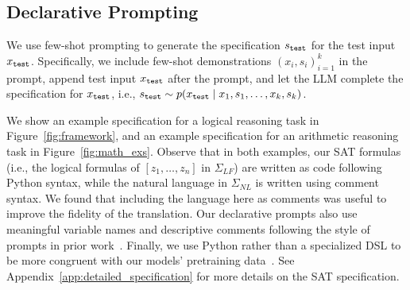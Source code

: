 \documentclass{article}
\theoremstyle{definition}
\newcommand\gd[1]{\todo[color=red!40]{{\bf Greg}: #1}}
\begin{document}


\subsection{Declarative Prompting}
\label{sec:sat_prompt}


We use few-shot prompting to generate the specification $s_{\tt test}$ for the test input $x_{\tt test}$. Specifically, we include few-shot demonstrations $(x_i,s_i)_{i=1}^k$ in the prompt, append test input $x_{\tt test}$ after the prompt, and let the LLM complete the specification for $x_{\tt test}$, i.e., $s_{\tt test} \sim p(x_{\tt test} \mid x_1,s_1,\ldots,x_k,s_k)$.

We show an example specification for a logical reasoning task in Figure~\ref{fig:framework}, and an example specification for an arithmetic reasoning task in Figure~\ref{fig:math_exs}. Observe that in both examples, our SAT formulas (i.e., the logical formulas of $[z_1,\ldots,z_n]$ in $\Sigma_{LF}$) are written as code following Python syntax, while the natural language in $\Sigma_{NL}$ is written using comment syntax. We found that including the language here as comments was useful to improve the fidelity of the translation. Our declarative prompts also use meaningful variable names and descriptive comments following the style of prompts in prior work~\citep{pal,faithfulcot}. Finally, we use Python rather than a specialized DSL to be more congruent with our models' pretraining data~\citep{instructgpt, codex}. See Appendix~\ref{app:detailed_specification} for more details on the SAT specification.
\end{document}
